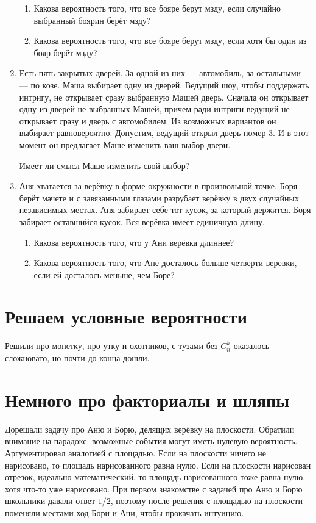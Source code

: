 \documentclass[12pt]{article}
\theoremstyle{definition}
\begin{document}
\begin{enumerate}
\begin{enumerate}
  \item Какова вероятность того, что все бояре берут мзду, если случайно выбранный боярин берёт мзду?
  \item Какова вероятность того, что все бояре берут мзду, если хотя бы один из бояр берёт мзду?
\end{enumerate}
\item Есть пять закрытых дверей. За одной из них — автомобиль, за остальными — по козе.
Маша выбирает одну из дверей.
Ведущий шоу, чтобы поддержать интригу, не открывает сразу выбранную Машей дверь.
Сначала он открывает одну из дверей не выбранных Машей,
причем ради интриги ведущий не открывает сразу и дверь с автомобилем. Из возможных вариантов он выбирает равновероятно.
Допустим, ведущий открыл дверь номер 3. 
И в этот момент он предлагает Маше изменить ваш выбор двери.

Имеет ли смысл Маше изменить свой выбор?
\item Аня хватается за верёвку в форме окружности в произвольной точке.
Боря берёт мачете и с завязанными глазами разрубает
верёвку в двух случайных независимых местах. Аня забирает себе тот кусок,
за который держится. Боря забирает оставшийся кусок. Вся верёвка имеет единичную длину.
\begin{enumerate}
\item Какова вероятность того, что у Ани верёвка длиннее?
\item Какова вероятность того, что Ане досталось больше четверти веревки, если ей досталось меньше, чем Боре?
\end{enumerate}


\end{enumerate}

\section{Решаем условные вероятности}

Решили про монетку, про утку и охотников, с тузами без $C_n^k$ оказалось сложновато, но почти до конца дошли. 


\section{Немного про факториалы и шляпы}

Дорешали задачу про Аню и Борю, делящих верёвку на плоскости. Обратили внимание на парадокс: 
возможные события могут иметь нулевую вероятность. Аргументировал аналогией с площадью. 
Если на плоскости ничего не нарисовано, то площадь нарисованного равна нулю. Если на плоскости 
нарисован отрезок, идеально математический, то площадь нарисованного тоже равна нулю, хотя что-то уже нарисовано.
При первом знакомстве с задачей про Аню и Борю школьники давали ответ $1/2$, поэтому после решения с площадью 
на плоскости поменяли местами ход Бори и Ани, чтобы прокачать интуицию.  
\end{document}
